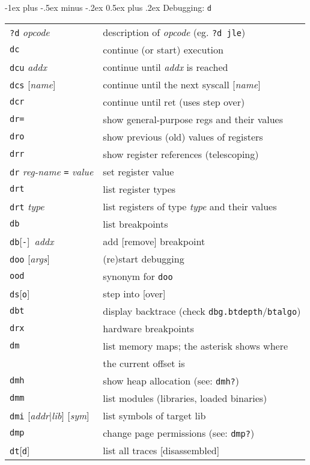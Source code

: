 \documentclass[a4paper,landscape]{article}
\makeatletter
\renewcommand{\section}{\@startsection{section}{1}{0mm}%
                                {-1ex plus -.5ex minus -.2ex}%
                                {0.5ex plus .2ex}%
                                {\normalfont\large\bfseries}}
\makeatother
\begin{document}
\begin{multicols*}{3}
\section{Debugging: \texttt{d}}
\begin{tabular}{@{}ll@{}}
\texttt{?d} \textit{opcode} & description of \textit{opcode} (eg. \texttt{?d jle}) \\
\texttt{dc} & continue (or start) execution \\
\texttt{dcu} \textit{addx} & continue until \textit{addx} is reached \\
\texttt{dcs} [\textit{name}] & continue until the next syscall [\textit{name}] \\
\texttt{dcr} & continue until ret (uses step over) \\
\texttt{dr=} & show general-purpose regs and their values \\
\texttt{dro} & show previous (old) values of registers \\
\texttt{drr} & show register references (telescoping) \\
\texttt{dr} \textit{reg-name} \texttt{=} \textit{value} & set register value \\
\texttt{drt} & list register types \\
\texttt{drt} \textit{type} & list registers of type \textit{type} and their values \\
\texttt{db} & list breakpoints \\
\texttt{db}[\texttt{-}]\ \textit{addx} & add [remove] breakpoint \\
\texttt{doo} [\textit{args}] & (re)start debugging \\
\texttt{ood} & synonym for \texttt{doo} \\
\texttt{ds}[\texttt{o}] & step into [over]\\
\texttt{dbt} & display backtrace (check \texttt{dbg.btdepth}/\texttt{btalgo}) \\
\texttt{drx} & hardware breakpoints \\
\texttt{dm} & list memory maps; the asterisk shows where \\ & the current offset is \\
\texttt{dmh} & show heap allocation (see: \texttt{dmh?}) \\
\texttt{dmm} & list modules (libraries, loaded binaries) \\
\texttt{dmi} [\textit{addr}|\textit{lib}] [\textit{sym}] & list symbols of target lib \\
\texttt{dmp} & change page permissions (see: \texttt{dmp?}) \\
\texttt{dt}[\texttt{d}] & list all traces [disassembled]
\end{tabular}


\end{multicols*}
\end{document}
